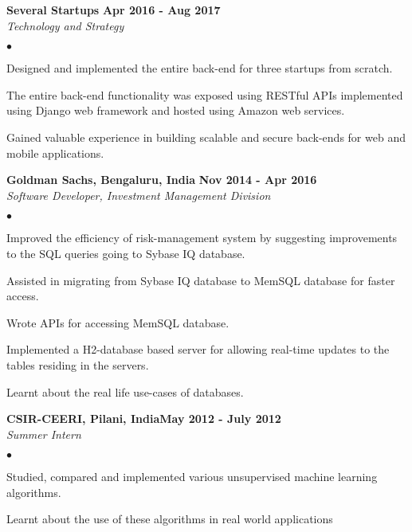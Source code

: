 \documentclass[margin,line]{res}
\newenvironment{list2}{
  \begin{list}{$\bullet$}{%
      \setlength{\itemsep}{0in}
      \setlength{\parsep}{0in} \setlength{\parskip}{0in}
      \setlength{\topsep}{0in} \setlength{\partopsep}{0in} 
      \setlength{\leftmargin}{0.2in}}}{\end{list}}
\begin{document}
\begin{resume}


{\bf Several Startups} \hfill {\bf Apr 2016 - Aug 2017}\\
{\em Technology and Strategy}
\vspace{.3cm}
\begin{list2}
\item Designed and implemented the entire back-end for three startups from scratch.
\item The entire back-end functionality was exposed using RESTful APIs implemented using Django web framework and hosted using Amazon web services.
\item Gained valuable experience in building scalable and secure back-ends for web and mobile applications.
\end{list2}

{\bf Goldman Sachs, Bengaluru, India} \hfill {\bf Nov 2014 - Apr 2016}\\
{\em Software Developer, Investment Management Division}
\vspace{.3cm}
\begin{list2}
\item Improved the efficiency of risk-management system by suggesting improvements to the SQL
queries going to Sybase IQ database.
\item Assisted in migrating from Sybase IQ database to MemSQL database for faster access.
\item Wrote APIs for accessing MemSQL database.
\item Implemented a H2-database based server for allowing real-time updates to the tables residing in
the servers.
\item Learnt about the real life use-cases of databases.
\end{list2}

{\bf CSIR-CEERI, Pilani, India}\hfill {\bf May 2012 - July 2012}\\
{\em Summer Intern} 
\vspace{.3cm}
\begin{list2}
\item Studied, compared and implemented various unsupervised machine learning algorithms.
\item Learnt about the use of these algorithms in real world applications
\end{list2}


\end{resume}
\end{document}
